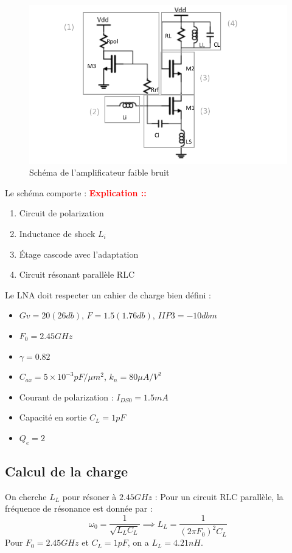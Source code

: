\documentclass[a4paper]{article}
\begin{document}
\begin{figure}[!htb]
\begin{center}
  \includegraphics[scale=0.47]{lna-anotated.png}
  \caption{Sch\'ema de l'amplificateur faible bruit\cite{RFIC-tp-lna}}
  \label{lna-ams}
\end{center}
\end{figure}

Le sch\'ema comporte : \textbf{\textcolor{red}{Explication ::}}
\begin{enumerate} \itemsep -3pt
  \item Circuit de polarization
  \item Inductance de shock $L_i$
  \item \'Etage cascode avec l'adaptation
  \item Circuit r\'esonant parall\`ele RLC
\end{enumerate}

Le LNA doit respecter un cahier de charge bien d\'efini :
\begin{itemize} \itemsep -3pt
  \item $Gv = 20 (26 db)$, $F = 1.5 (1.76 db)$, $IIP3 = -10 dbm$
  \item $F_0 = 2.45 GHz$
  \item$\gamma = 0.82$
  \item $C_{ox} = 5 \times 10^{-3} pF/\mu m^2 $, $k_n = 80 \mu A/V^2$
  \item Courant de polarization : $I_{DS0} = 1.5 mA$
  \item Capacit\'e en sortie $C_L = 1 pF $
  \item $Q_e = 2$
\end{itemize}


\subsection{Calcul de la charge}
On cherche $L_L$ pour r\'esoner \`a $2.45 GHz$ : Pour un circuit RLC parall\`ele,
la fr\'equence de r\'esonance est donn\'ee par :
\[
  \omega_0 = \frac{1}{\sqrt{L_L C_L}} \implies L_L = \frac{1}{(2\pi F_0)^2 C_L}
\]
Pour $F_0 = 2.45 GHz$ et $C_L = 1 pF$, on a $L_L = 4.21 nH$.
\end{document}
